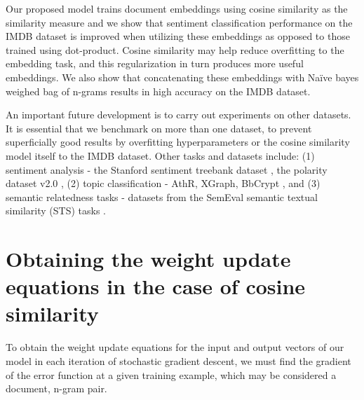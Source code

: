 \documentclass[11pt,a4paper]{article}
\begin{document}
Our proposed model trains document embeddings using cosine similarity as the similarity measure and we show that sentiment classification performance on the IMDB dataset is improved when utilizing these embeddings as opposed to those trained using dot-product. Cosine similarity may help reduce overfitting to the embedding task, and this regularization in turn produces more useful embeddings. We also show that concatenating these embeddings with Naïve bayes weighed bag of n-grams results in high accuracy on the IMDB dataset. 

 An important future development is to carry out experiments on other datasets. It is essential that we benchmark on more than one dataset, to prevent superficially good results by overfitting hyperparameters or the cosine similarity model itself to  the IMDB dataset. 
Other tasks and datasets include: (1) sentiment analysis - the Stanford sentiment treebank dataset \cite{socher2013}, the polarity dataset v2.0 \cite{pang2004}, (2) topic classification -  AthR, XGraph, BbCrypt \cite{wang2012}, and (3) semantic relatedness tasks - datasets from the SemEval semantic textual similarity (STS) tasks \cite{agirre2015}.








\appendix

\section{Obtaining the weight update equations in the case of cosine similarity}

To obtain the weight update equations for the input and output vectors of our model in each iteration of stochastic gradient descent, we must find the gradient of the error function at a given training example, which may be considered a document, n-gram pair. 
\end{document}
